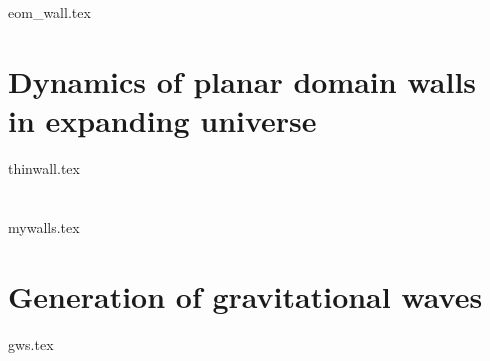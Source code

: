 


















\section{}\label{sec:pertwalls:eom_wall}
    {{eom_wall.tex}}

\section{Dynamics of planar domain walls in expanding universe}\label{sec:pertwalls:thinwall}
    {{thinwall.tex}}

\section{}\label{sec:pertwalls:mywalls}
    {{mywalls.tex}}


\section{Generation of gravitational waves}\label{sec:pertwalls:gws}
    {{gws.tex}}




